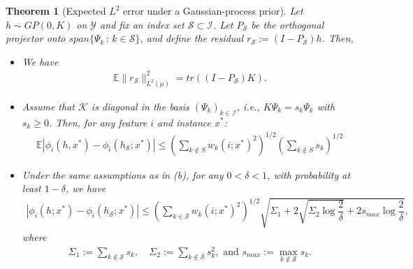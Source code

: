 \documentclass[letterpaper,11pt]{article}
\numberwithin{equation}{section}
\newtheorem{theorem}{Theorem}[section]
\renewcommand{\leq}{\leqslant}
\renewcommand{\geq}{\geqslant}
\numberwithin{equation}{section}
\begin{document}
\begin{theorem}[Expected $L^2$ error under a Gaussian-process prior]
\label{thm:error:analysis:02}
Let $h\sim GP(0,K)$ on $\mathcal{Y}$ and fix an index set $\mathcal{S}\subset \mathcal{I}$. Let $P_{\mathcal{S}}$ be the orthogonal projector onto $span\{\Psi_k\,:\, k\in \mathcal{S}\}$, and define the residual $r_{\mathcal{S}}:=(I-P_{\mathcal{S}})h$. Then,
    \begin{itemize}
    \item We have
    \begin{align*}
        \mathbb{E}\|r_\mathcal{S}\|_{L^2(\mu)}^2 =tr((I-P_{\mathcal{S}})K).
    \end{align*}
    \item Assume that $\mathcal{K}$ is diagonal in the basis $(\Psi_k)_{k\in \mathcal{I}}$, i.e., $K\Psi_k =s_k \Psi_k$ with $s_k\geq 0$. Then, for any feature $i$ and instance $x^*$:
        \begin{align}
            \label{error:bound:E:SHAP}
            \mathbb{E}|\phi_i (h,x^*) - \phi_i(h_{\mathcal{S}};x^*)| \leq \left(\sum_{k\notin S} w_k(i;x^*)^2 \right)^{1/2} \left(\sum_{k\notin S} s_k \right)^{1/2}
        \end{align}

    \item Under the same assumptions as in (b), for any $0<\delta <1$, with probability at least $1-\delta$, we have
    \begin{align}
        \label{error:bound:prob:SHAP}
        |\phi_i(h;x^*) - \phi_i(h_\mathcal{S}; x^*)|
        \leq \left( \sum_{k\in \mathcal{S}} w_k(i;x^*)^2 \right)^{1/2} \sqrt{\Sigma_1 + 2\sqrt{\Sigma_2 \log \dfrac{2}{\delta}} + 2s_{max} \log \dfrac{2}{\delta}}, 
    \end{align}
    where
    \begin{align*}
        \Sigma_1:= \sum_{k\notin \mathcal{S}} s_k,\quad \Sigma_2:=\sum_{k\notin \mathcal{S}} s_k^2,\text{ and }s_{max}:=\max_{k\notin \mathcal{S}} s_k.
    \end{align*}
    \end{itemize}
\end{theorem}

\end{document}
